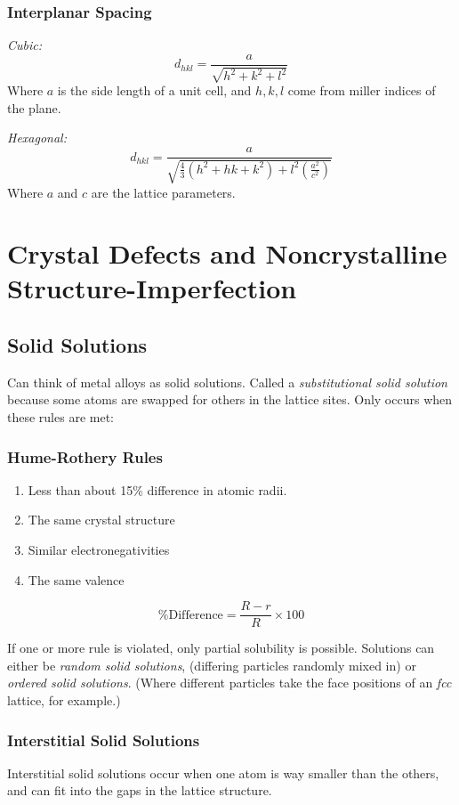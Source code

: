 \documentclass[10pt,letterpaper]{article}
\begin{document}
	\subsubsection*{Interplanar Spacing}
	\textit{Cubic:}
	$$
	d_{hkl} = \frac{a}{\sqrt{h^2 + k^2 + l^2}}
	$$
	Where $a$ is the side length of a unit cell, and $h,k,l$ come from miller indices of the plane. 
	
	\textit{Hexagonal: }
	$$
	d_{hkl} = \frac{a}{\sqrt{\frac{4}{3}(h^2 + hk + k^2)+l^2(\frac{a^2}{c^2})}}
	$$ 
	Where $a$ and $c$ are the lattice parameters. 
	
	
	\section{Crystal Defects and Noncrystalline Structure-Imperfection}
	\subsection{Solid Solutions}
	Can think of metal alloys as solid solutions.  Called a \textit{substitutional solid solution} because some atoms are swapped for others in the lattice sites. Only occurs when these rules are met: 
	\subsubsection{Hume-Rothery Rules}
	\begin{enumerate}
		\item Less than about 15\% difference in atomic radii.
		\item The same crystal structure
		\item Similar electronegativities 
		\item The same valence
	\end{enumerate}
	$$
	\% \text{Difference} = \frac{R - r}{R} \times 100
	$$
	
	If one or more rule is violated, only partial solubility is possible. Solutions can either be \textit{random solid solutions}, (differing particles randomly mixed in) or \textit{ordered solid solutions}. (Where different particles take the face positions of an \textit{fcc} lattice, for example.)
	
	\subsubsection{Interstitial Solid Solutions}
	Interstitial solid solutions occur when one atom is way smaller than the others, and can fit into the gaps in the lattice structure. 
	
\end{document}
